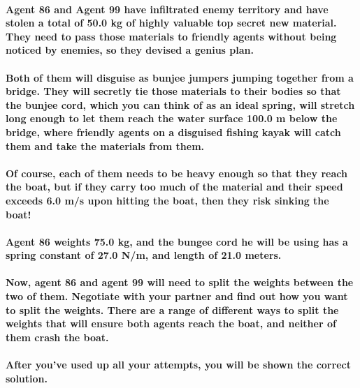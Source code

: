 \paragraph{Agent 86 and Agent 99 have inﬁltrated enemy territory and have stolen a total of 50.0 kg of highly valuable top secret new material. They need to pass those materials to friendly agents without being noticed by enemies, so they devised a genius plan.\newline}
\paragraph{Both of them will disguise as bunjee jumpers jumping together from a bridge. They will secretly tie those materials to their bodies so that the bunjee cord, which you can think of as an ideal spring, will stretch long enough to let them reach the water surface 100.0 m below the bridge, where friendly agents on a disguised ﬁshing kayak will catch them and take the materials from them.\newline}
\paragraph{Of course, each of them needs to be heavy enough so that they reach the boat, but if they carry too much of the material and their speed exceeds 6.0 m/s upon hitting the boat, then they risk sinking the boat!\newline}
\paragraph{Agent 86 weights 75.0 kg, and the bungee cord he will be using has a spring constant of 27.0 N/m, and length of 21.0 meters.\newline}
\paragraph{Now, agent 86 and agent 99 will need to split the weights between the two of them. Negotiate with your partner and find out how you want to split the weights. There are a range of different ways to split the weights that will ensure both agents reach the boat, and neither of them crash the boat.\newline}
\paragraph{After you’ve used up all your attempts, you will be shown the correct solution. \newline}